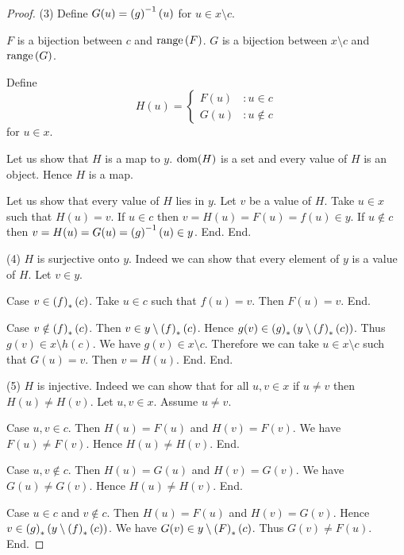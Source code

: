\documentclass{article}
\begin{document}
\begin{forthel}
\begin{proof}
        (3) Define $G(u) = \left(g\right)^{-1}(u)$ for $u \in x \setminus c$.

        $F$ is a bijection between $c$ and $\mathrm{range}\left(F\right)$.
        $G$ is a bijection between $x \setminus c$ and $\mathrm{range}\left(G\right)$.

        Define \[ H(u) =
          \begin{cases}
            F(u) & : u \in c \\
            G(u) & : u \notin c
          \end{cases} \]
        for $u \in x$.

        Let us show that $H$ is a map to $y$.
          $\operatorname{dom}(H)$ is a set and every value of $H$ is an object.
          Hence $H$ is a map.

          Let us show that every value of $H$ lies in $y$.
            Let $v$ be a value of $H$.
            Take $u \in x$ such that $H(u) = v$.
            If $u \in c$ then $v = H(u) = F(u) = f(u) \in y$.
            If $u \notin c$ then $v = H(u) = G(u) = \left(g\right)^{-1}(u) \in y$.
          End.
        End.

        (4) $H$ is surjective onto $y$.
        Indeed we can show that every element of $y$ is a value of $H$.
          Let $v \in y$.

          Case $v \in \left(f\right)_{*}(c)$.
            Take $u \in c$ such that $f(u) = v$.
            Then $F(u) = v$.
          End.

          Case $v \notin \left(f\right)_{*}(c)$.
            Then $v \in y \setminus \left(f\right)_{*}(c)$.
            Hence $g(v) \in \left(g\right)_{*}(y \setminus \left(f\right)_{*}(c))$.
            Thus $g(v) \in x \setminus h(c)$.
            We have $g(v) \in x \setminus c$.
            Therefore we can take $u \in x \setminus c$ such that $G(u) = v$.
            Then $v = H(u)$.
          End.
        End.

        (5) $H$ is injective.
        Indeed we can show that for all $u, v \in x$ if $u \neq v$ then
        $H(u) \neq H(v)$.
          Let $u,v \in x$.
          Assume $u \neq v$.

          Case $u,v \in c$.
            Then $H(u) = F(u)$ and $H(v) = F(v)$.
            We have $F(u) \neq F(v)$.
            Hence $H(u) \neq H(v)$.
          End.

          Case $u,v \notin c$.
            Then $H(u) = G(u)$ and $H(v) = G(v)$.
            We have $G(u) \neq G(v)$.
            Hence $H(u) \neq H(v)$.
          End.

          Case $u \in c$ and $v \notin c$.
            Then $H(u) = F(u)$ and $H(v) = G(v)$.
            Hence $v \in \left(g\right)_{*}(y \setminus \left(f\right)_{*}(c))$.
            We have $G(v) \in y \setminus \left(F\right)_{*}(c)$.
            Thus $G(v) \neq F(u)$.
          End.


\end{proof}
\end{forthel}
\end{document}
